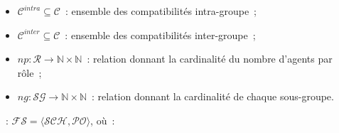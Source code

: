 \begin{itemize}
\begin{itemize}
              \item $\mathcal{C}^{intra} \subseteq \mathcal{C}$~: ensemble des compatibilités intra-groupe~;
              \item $\mathcal{C}^{inter} \subseteq \mathcal{C}$~: ensemble des compatibilités inter-groupe~;
              \item $np: \mathcal{R} \rightarrow \mathbb{N} \times \mathbb{N}$~: relation donnant la cardinalité du nombre d'agents par rôle~;
              \item $ng: \mathcal{SG} \rightarrow \mathbb{N} \times \mathbb{N}$~: relation donnant la cardinalité de chaque sous-groupe.
          \end{itemize}
\end{itemize}

\medskip

\noindent \textbf{}~: \quad $\mathcal{FS} = \langle \mathcal{SCH}, \mathcal{PO} \rangle$, où~:

